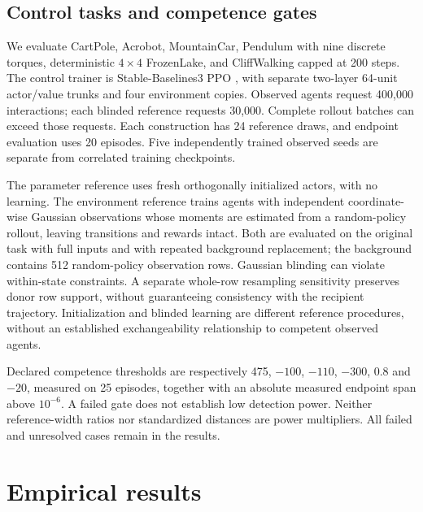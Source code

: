 \documentclass[10pt,twocolumn]{article}
\begin{document}
\subsection{Control tasks and competence gates}
We evaluate CartPole, Acrobot, MountainCar, Pendulum with nine discrete torques,
deterministic $4\times4$ FrozenLake, and CliffWalking capped at 200 steps.
The control trainer is Stable-Baselines3 PPO \citep{raffin2021}, with separate
two-layer 64-unit actor/value trunks and four environment copies. Observed
agents request 400,000 interactions; each blinded reference requests 30,000.
Complete rollout batches can exceed those requests. Each construction has 24
reference draws, and endpoint evaluation uses 20 episodes. Five independently
trained observed seeds are separate from correlated training checkpoints.

The parameter reference uses fresh orthogonally initialized actors, with no
learning. The environment reference trains agents with independent
coordinate-wise Gaussian observations whose moments are estimated from a
random-policy rollout, leaving transitions and rewards intact. Both are
evaluated on the original task with full inputs and with repeated background
replacement; the background contains 512 random-policy observation rows.
Gaussian blinding can violate within-state constraints. A separate whole-row
resampling sensitivity preserves donor row support, without guaranteeing
consistency with the recipient trajectory. Initialization and blinded learning
are different reference procedures, without an established exchangeability
relationship to competent observed agents.

Declared competence thresholds are respectively 475, $-100$, $-110$, $-300$,
0.8 and $-20$, measured on 25 episodes, together with an absolute measured
endpoint span above $10^{-6}$. A failed gate does not establish low detection power. Neither
reference-width ratios nor standardized distances are power multipliers.
All failed and unresolved cases remain in the results.

\section{Empirical results}
\end{document}
